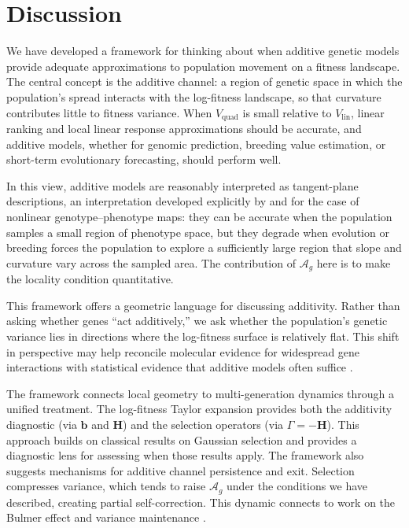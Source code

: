\documentclass[9pt,twocolumn,twoside,lineno]{gsajnl}
\newcommand{\vect}[1]{\boldsymbol{#1}}
\newcommand{\mat}[1]{\mathbf{#1}}
\newcommand{\Ag}{\ensuremath{\mathcal{A}_{g}}\xspace}
\newcommand{\Vlin}{\ensuremath{V_{\text{lin}}}\xspace}
\newcommand{\Vquad}{\ensuremath{V_{\text{quad}}}\xspace}
\begin{document}
\section{Discussion}
\label{sec:discussion}

We have developed a framework for thinking about when additive genetic models provide adequate approximations to population movement on a fitness landscape. The central concept is the additive channel: a region of genetic space in which the population's spread interacts with the log-fitness landscape, so that curvature contributes little to fitness variance. When $\Vquad$ is small relative to $\Vlin$, linear ranking and local linear response approximations should be accurate, and additive models, whether for genomic prediction, breeding value estimation, or short-term evolutionary forecasting, should perform well. 

In this view, additive models are reasonably interpreted as tangent-plane descriptions, an interpretation developed explicitly by \citet{Rice2008} and \citet{MiloccoSalazarCiudad2022} for the case of nonlinear genotype--phenotype maps: they can be accurate when the population samples a small region of phenotype space, but they degrade when evolution or breeding forces the population to explore a sufficiently large region that slope and curvature vary across the sampled area. The contribution of $\Ag$ here is to make the locality condition quantitative.

This framework offers a geometric language for discussing additivity. Rather than asking whether genes ``act additively,'' we ask whether the population's genetic variance lies in directions where the log-fitness surface is relatively flat. This shift in perspective may help reconcile molecular evidence for widespread gene interactions with statistical evidence that additive models often suffice \citep{HillGoddardVisscher2008, SellaBarton2019}.

The framework connects local geometry to multi-generation dynamics through a unified treatment. The log-fitness Taylor expansion provides both the additivity diagnostic (via $\vect{b}$ and $\mat{H}$) and the selection operators (via $\Gamma = -\mat{H}$). This approach builds on classical results on Gaussian selection \citep{Lande1979, BartonTurelli1991, Barton2017} and provides a diagnostic lens for assessing when those results apply. The framework also suggests mechanisms for additive channel persistence and exit. Selection compresses variance, which tends to raise \Ag under the conditions we have described, creating partial self-correction. This dynamic connects to work on the Bulmer effect \citep{Bulmer1971} and variance maintenance \citep{Turelli1988, Burger2000}.
\end{document}
